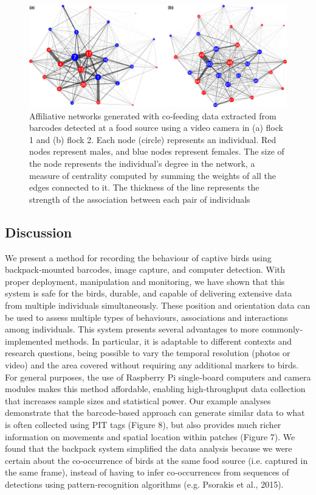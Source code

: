 \documentclass[11pt,a4paper,oneside]{article}
\begin{document}
\begin{figure}
    \centering
    \includegraphics{Graving_IMPRS_Thesis/figures/bird_figure_8.jpg}
    \caption{Affiliative networks generated with co‐feeding data extracted from barcodes detected at a food source using a video camera in (a) flock 1 and (b) flock 2. Each node (circle) represents an individual. Red nodes represent males, and blue nodes represent females. The size of the node represents the individual's degree in the network, a measure of centrality computed by summing the weights of all the edges connected to it. The thickness of the line represents the strength of the association between each pair of individuals
}
    \label{fig:bird_figure_8}
\end{figure}

\subsection{Discussion}
We present a method for recording the behaviour of captive birds using backpack‐mounted barcodes, image capture, and computer detection. With proper deployment, manipulation and monitoring, we have shown that this system is safe for the birds, durable, and capable of delivering extensive data from multiple individuals simultaneously. These position and orientation data can be used to assess multiple types of behaviours, associations and interactions among individuals. This system presents several advantages to more commonly‐implemented methods. In particular, it is adaptable to different contexts and research questions, being possible to vary the temporal resolution (photos or video) and the area covered without requiring any additional markers to birds. For general purposes, the use of Raspberry Pi single‐board computers and camera modules makes this method affordable, enabling high‐throughput data collection that increases sample sizes and statistical power. Our example analyses demonstrate that the barcode‐based approach can generate similar data to what is often collected using PIT tags (Figure 8), but also provides much richer information on movements and spatial location within patches (Figure 7). We found that the backpack system simplified the data analysis because we were certain about the co‐occurrence of birds at the same food source (i.e. captured in the same frame), instead of having to infer co‐occurrences from sequences of detections using pattern‐recognition algorithms (e.g. Psorakis et al., 2015).
\end{document}
